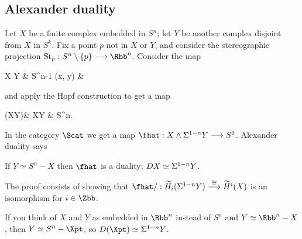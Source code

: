 \subsection*{Alexander duality}
Let $X$ be a finite complex embedded in $S^n$; let $Y$ be another complex disjoint from $X$ in $S^k$. Fix a point $p$ not in $X$ or $Y$, and consider the stereographic projection $\textup{St}_p:S^n\setminus\{p\}\to\Rbb^n$.  Consider the map
\begin{cjointikzcd}
\diagram  X \times Y  \rar & S^{n-1}
%
\diagram {}
%
\diagram (x, y)  \rar[mapsto] & 
\end{cjointikzcd}
and apply the Hopf construction to get a map
\begin{ctikzcd}
\Sigma(X\wedge Y)\rar["\simeq"] & X\ast Y \rar & S^n.
\end{ctikzcd}
In the category $\Scat$ we get a map $\fhat: X \sprod \Suspend^{1-n} Y \to S^0$.  Alexander duality says
\begin{thm}
If $Y \simeq S^n - X$ then $\fhat$ is a duality; $DX \simeq \Sigma^{1-n} Y$.
\end{thm}
\noindent The proof consists of showing that $\fhat/: \widetilde H_i (\Suspend^{1-n} Y) \stackrel{\cong}{\to} \widetilde H^i (X)$ is an isomorphism for $i \in \Zbb$.
\begin{rem}
If you think of $X$ and $Y$ as embedded in $\Rbb^n$ instead of $S^n$ and $Y \simeq \Rbb^n - X$, then $Y \simeq S^n - \Xpt$, so $D(\Xpt) \simeq \Suspend^{1-n} Y$.
\end{rem}

